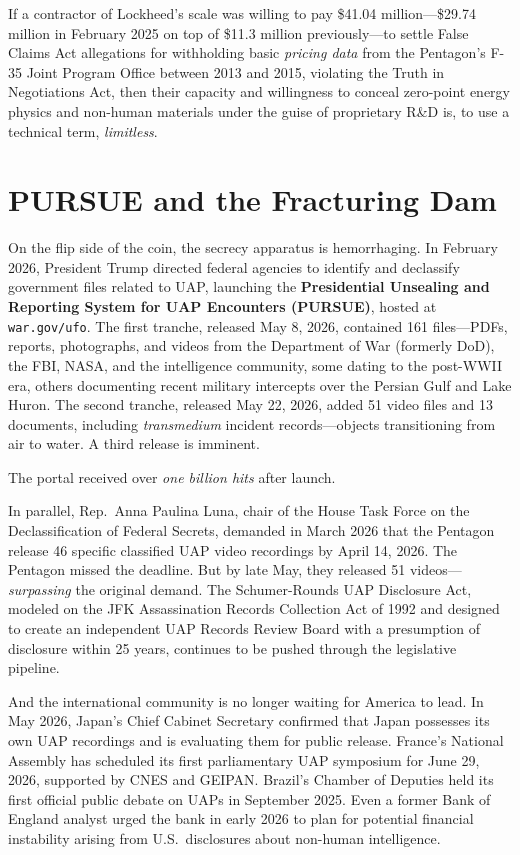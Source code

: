 \documentclass[11pt,a4paper]{article}
\begin{document}
If a contractor of Lockheed's scale was willing to pay \$41.04 million---\$29.74 million in February 2025 on top of \$11.3 million previously---to settle False Claims Act allegations for withholding basic \textit{pricing data} from the Pentagon's F-35 Joint Program Office between 2013 and 2015, violating the Truth in Negotiations Act, then their capacity and willingness to conceal zero-point energy physics and non-human materials under the guise of proprietary R\&D is, to use a technical term, \textit{limitless}.

\section{PURSUE and the Fracturing Dam}

On the flip side of the coin, the secrecy apparatus is hemorrhaging. In February 2026, President Trump directed federal agencies to identify and declassify government files related to UAP, launching the \textbf{Presidential Unsealing and Reporting System for UAP Encounters (PURSUE)}, hosted at \texttt{war.gov/ufo}. The first tranche, released May 8, 2026, contained 161 files---PDFs, reports, photographs, and videos from the Department of War (formerly DoD), the FBI, NASA, and the intelligence community, some dating to the post-WWII era, others documenting recent military intercepts over the Persian Gulf and Lake Huron. The second tranche, released May 22, 2026, added 51 video files and 13 documents, including \textit{transmedium} incident records---objects transitioning from air to water. A third release is imminent.

The portal received over \textit{one billion hits} after launch.

In parallel, Rep.\ Anna Paulina Luna, chair of the House Task Force on the Declassification of Federal Secrets, demanded in March 2026 that the Pentagon release 46 specific classified UAP video recordings by April 14, 2026. The Pentagon missed the deadline. But by late May, they released 51 videos---\textit{surpassing} the original demand. The Schumer-Rounds UAP Disclosure Act, modeled on the JFK Assassination Records Collection Act of 1992 and designed to create an independent UAP Records Review Board with a presumption of disclosure within 25 years, continues to be pushed through the legislative pipeline.

And the international community is no longer waiting for America to lead. In May 2026, Japan's Chief Cabinet Secretary confirmed that Japan possesses its own UAP recordings and is evaluating them for public release. France's National Assembly has scheduled its first parliamentary UAP symposium for June 29, 2026, supported by CNES and GEIPAN. Brazil's Chamber of Deputies held its first official public debate on UAPs in September 2025. Even a former Bank of England analyst urged the bank in early 2026 to plan for potential financial instability arising from U.S.\ disclosures about non-human intelligence.
\end{document}
